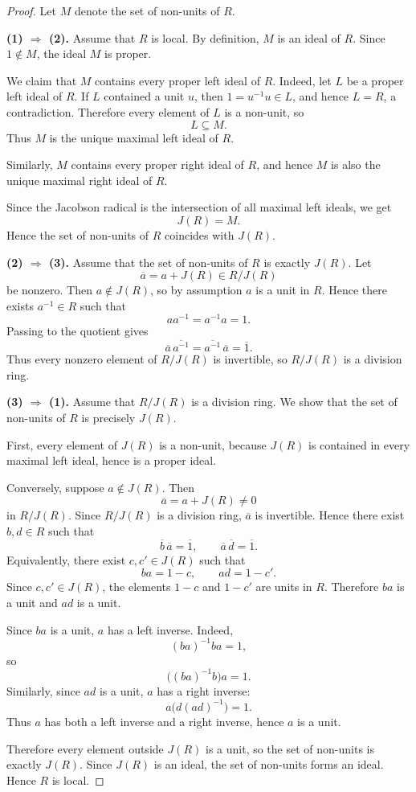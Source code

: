 \begin{proof}
    Let $M$ denote the set of non-units of $R$.

    \textbf{(1) $\Rightarrow$ (2).}
    Assume that $R$ is local. By definition, $M$ is an ideal of $R$.
    Since $1\notin M$, the ideal $M$ is proper.

    We claim that $M$ contains every proper left ideal of $R$.
    Indeed, let $L$ be a proper left ideal of $R$. If $L$ contained a unit $u$,
    then $1=u^{-1}u\in L$, and hence $L=R$, a contradiction. Therefore every
    element of $L$ is a non-unit, so
    \[
        L\subseteq M.
    \]
    Thus $M$ is the unique maximal left ideal of $R$.

    Similarly, $M$ contains every proper right ideal of $R$, and hence $M$ is also
    the unique maximal right ideal of $R$.

    Since the Jacobson radical is the intersection of all maximal left ideals, we get
    \[
        J(R)=M.
    \]
    Hence the set of non-units of $R$ coincides with $J(R)$.

    \textbf{(2) $\Rightarrow$ (3).}
    Assume that the set of non-units of $R$ is exactly $J(R)$.
    Let
    \[
        \overline{a}=a+J(R)\in R/J(R)
    \]
    be nonzero. Then $a\notin J(R)$, so by assumption $a$ is a unit in $R$.
    Hence there exists $a^{-1}\in R$ such that
    \[
        aa^{-1}=a^{-1}a=1.
    \]
    Passing to the quotient gives
    \[
        \overline{a}\,\overline{a^{-1}}
        =
        \overline{a^{-1}}\,\overline{a}
        =
        \overline{1}.
    \]
    Thus every nonzero element of $R/J(R)$ is invertible, so $R/J(R)$ is a
    division ring.

    \textbf{(3) $\Rightarrow$ (1).}
    Assume that $R/J(R)$ is a division ring.
    We show that the set of non-units of $R$ is precisely $J(R)$.

    First, every element of $J(R)$ is a non-unit, because $J(R)$ is contained in
    every maximal left ideal, hence is a proper ideal.

    Conversely, suppose $a\notin J(R)$. Then
    \[
        \overline{a}=a+J(R)\neq 0
    \]
    in $R/J(R)$. Since $R/J(R)$ is a division ring, $\overline{a}$ is invertible.
    Hence there exist $b,d\in R$ such that
    \[
        \overline{b}\,\overline{a}=\overline{1},
        \qquad
        \overline{a}\,\overline{d}=\overline{1}.
    \]
    Equivalently, there exist $c,c'\in J(R)$ such that
    \[
        ba=1-c,
        \qquad
        ad=1-c'.
    \]
    Since $c,c'\in J(R)$, the elements $1-c$ and $1-c'$ are units in $R$.
    Therefore $ba$ is a unit and $ad$ is a unit.

    Since $ba$ is a unit, $a$ has a left inverse. Indeed,
    \[
        (ba)^{-1}ba=1,
    \]
    so
    \[
        \bigl((ba)^{-1}b\bigr)a=1.
    \]
    Similarly, since $ad$ is a unit, $a$ has a right inverse:
    \[
        a\bigl(d(ad)^{-1}\bigr)=1.
    \]
    Thus $a$ has both a left inverse and a right inverse, hence $a$ is a unit.

    Therefore every element outside $J(R)$ is a unit, so the set of non-units is
    exactly $J(R)$. Since $J(R)$ is an ideal, the set of non-units forms an ideal.
    Hence $R$ is local.
\end{proof}

